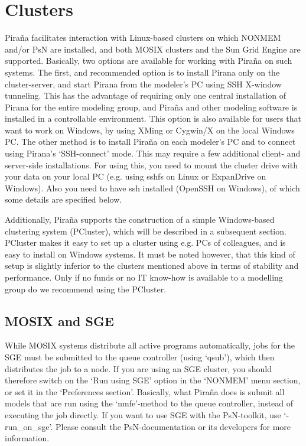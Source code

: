 \documentclass[a4,11pt]{report} \usepackage[pdftex]{graphicx}
\begin{document}
{\section{Clusters} Pira\~na facilitates interaction with Linux-based
clusters on which NONMEM and/or PsN are installed, and both MOSIX
clusters and the Sun Grid Engine are supported. Basically, two options
are available for working with Pira\~na on such systems.  The first,
and recommended option is to install Pirana only on the cluster-server, and start
Pirana from the modeler's PC using SSH X-window tunneling. This has
the advantage of requiring only one central installation of Pirana for
the entire modeling group, and Pira\~na and other modeling software is
installed in a controllable environment. This option is also available
for users that want to work on Windows, by using XMing or Cygwin/X on
the local Windows PC.  The other method is to install Pira\~na on each
modeler's PC and to connect using Pirana's `SSH-connect' mode. This
may require a few additional client- and server-side
installations. For using this, you need to mount the cluster drive
with your data on your local PC (e.g. using sshfs on Linux or
ExpanDrive on Windows). Also you need to have ssh installed (OpenSSH
on Windows), of which some details are specified below.

Additionally, Pira\~na supports the construction of a simple
Windows-based clustering system (PCluster), which will be described in a
subsequent section. PCluster makes it easy to set up a cluster using
e.g. PCs of colleagues, and is easy to install on Windows systems. It
must be noted however, that this kind of setup is slightly inferior to the
clusters mentioned above in terms of stability and performance. Only
if no funds or no IT know-how is available to a modelling group do we
recommend using the PCluster.

\subsection{MOSIX and SGE}
While MOSIX systems distribute all active programs automatically, jobs
for the SGE must be submitted to the queue controller (using `qsub'),
which then distributes the job to a node. If you are using an SGE
cluster, you should therefore switch on the `Run using SGE' option in
the `NONMEM' menu section, or set it in the `Preferences
section'. Basically, what Pira\~na does is submit all models that are
run using the `nmfe'-method to the queue controller, instead of
executing the job directly. If you want to use SGE with the
PsN-toolkit, use `-run\_on\_sge'. Please consult the PsN-documentation
or its developers for more information.


}
\end{document}
